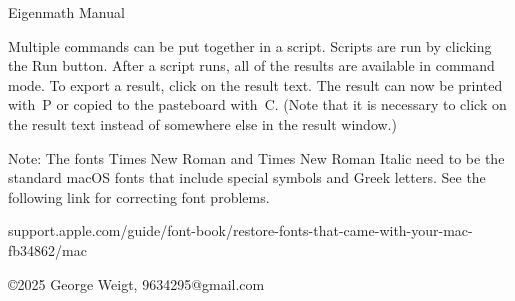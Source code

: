 

\begin{center}
{\LARGE Eigenmath Manual}
\end{center}

\begin{center}
\end{center}

Multiple commands can be put together in a script.
Scripts are run by clicking the Run button.
After a script runs, all of the results are available in command mode.
To export a result, click on the result text.
The result can now be printed with \cmd$\,$P or copied to the pasteboard with \cmd$\,$C.
(Note that it is necessary to click on the result text
instead of somewhere else in the result window.)

\bigskip
Note: The fonts Times New Roman and Times New Roman Italic need
to be the standard macOS fonts that include special symbols and Greek letters.
See the following link for correcting font problems.

\begin{center}
support.apple.com/guide/font-book/restore-fonts-that-came-with-your-mac-fb34862/mac
\end{center}

\vfill
\copyright 2025 George Weigt, 9634295@gmail.com
\newpage

\tableofcontents


